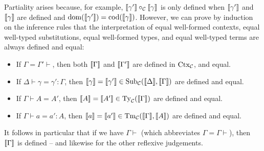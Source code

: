 \documentclass{lmcs}
\begin{document}
Partiality arises because, for example, $\llbracket \gamma' \rrbracket \circ_{\mathcal C} {\llbracket \gamma \rrbracket}$ is only defined when $\llbracket \gamma' \rrbracket$ and $\llbracket \gamma \rrbracket$ are defined and $\operatorname{dom}(\llbracket \gamma' \rrbracket) = \operatorname{cod}(\llbracket \gamma \rrbracket)$.
However, we can prove by induction on the inference rules that the interpretation of equal well-formed contexts, equal well-typed substitutions, equal well-formed types, and equal well-typed terms are always defined and equal:
\begin{lem}\hfill
\label{lemma:interp_defined}
  \begin{itemize}
  \item If $\Gamma = \Gamma' \vdash$, then
    both $\llbracket \Gamma \rrbracket$ and $\llbracket \Gamma' \rrbracket$ are defined in $\mathrm{Ctx}_{\mathcal C}$, and equal.
  \item If $\Delta \vdash \gamma = \gamma' : \Gamma$, then
    $\llbracket \gamma \rrbracket = \llbracket \gamma' \rrbracket \in \mathrm{Sub}_{\mathcal C}(\llbracket \Delta \rrbracket,{\llbracket \Gamma \rrbracket})$ are defined and
equal.
  \item If $\Gamma \vdash A = A'$, then
    $\llbracket A \rrbracket = \llbracket A' \rrbracket \in \mathrm{Ty}_{\mathcal C}(\llbracket \Gamma \rrbracket)$ are defined and equal.
  \item If $\Gamma \vdash a = a' : A$, then
    $\llbracket a \rrbracket = \llbracket a' \rrbracket \in \mathrm{Tm}_{\mathcal C}(\llbracket \Gamma \rrbracket,\llbracket A \rrbracket)$ are defined and equal.
  \end{itemize}
\end{lem}

It follows in particular that if we have $\Gamma \vdash$ (which abbreviates $\Gamma = \Gamma \vdash$), then $\llbracket \Gamma \rrbracket$ is defined -- and likewise for the other
reflexive judgements.

\end{document}
